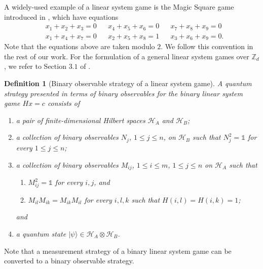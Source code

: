\documentclass[11pt,letterpaper]{article}
\newcommand{\ket}[1]{|#1\rangle}
\newcommand{\x}{\otimes}
\newcommand{\Z}{\mathbb{Z}}
\newcommand{\calH}{\mathcal{H}}
\newcommand{\1}{\mathbb{1}}
\def\carl#1{{\color{blue} #1}}
\newcommand{\hf}[1]{\textcolor{red}{#1}}
\newtheorem{definition}[theorem]{Definition}
\theoremstyle{definition}
\begin{document}
A widely-used example of a linear system game is the Magic Square game introduced in \cite{magic_square}, which 
have equations
\begin{align*}
    &x_1 + x_2 + x_3 = 0 && x_4 + x_5 + x_6 = 0 &&
    x_7 + x_8 + x_9 = 0 \\
    &x_1 + x_4 + x_7 = 0 && x_2 + x_5 + x_8 = 1 &&
    x_3 + x_6 + x_9 = 0.
\end{align*}
Note that the equations above are taken modulo $2$.
We follow this convention in the rest of our work.
For the formulation of a general linear system games over $\Z_d$, we refer to Section $3.1$ of \cite{coladan2017}.

\begin{definition}[Binary observable strategy of a linear system game]
\label{def:q_strat}
A quantum strategy presented in terms of binary observables for the binary linear system game $Hx = c$ consists of 
\begin{enumerate}
	\item a pair of finite-dimensional Hilbert spaces $\calH_A$ and $\calH_B$; 
	\item a collection of binary observables $N_j$, $1 \leq j \leq n$, on $\calH_B$
	such that $N_j^2 = \1$ for every $1 \leq j \leq n$; 
	\item a collection of binary observables $M_{ij}$, $1\leq i \leq m$, $1\leq j\leq n$ 
	on $\calH_A$ such that 
	\begin{enumerate}
		\item $M_{ij}^2 = \1$ for every $i,j$, and
		\item $M_{il}M_{ik} = M_{ik}M_{il}$ for every $i,l,k$ such that $H(i,l) = H(i,k) =1$;
	\end{enumerate} 
	and
	\item a quantum state $\ket{\psi} \in \calH_A \x \calH_B$.
\end{enumerate}
\end{definition}
Note that a measurement strategy of a binary linear system game can be converted to a binary observable strategy. 
\end{document}
